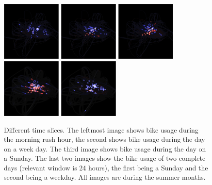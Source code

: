 \begin{figure}
\centering
\includegraphics[width=3cm]{images/rush_7_tue.png}
\hspace*{0.5cm}
\includegraphics[width=3cm]{images/day_7_fri.png}
\hspace*{0.5cm}
\includegraphics[width=3cm]{images/day_7_sun.png}
\hspace*{0.5cm}
\includegraphics[width=3cm]{images/full_10_sun.png}
\hspace*{0.5cm}
\includegraphics[width=3cm]{images/full_10_wed.png}
\caption{Different time slices. The leftmost image shows
bike usage during the morning rush hour, the second shows
bike usage during the day on a week day. The third image
shows bike usage during the day on a Sunday.
The last two images show the bike usage of two complete
days (relevant window is 24 hours), the first being a Sunday
and the second being a weekday. All images are during the summer months.}
\label{fig:smallm}
\end{figure}

